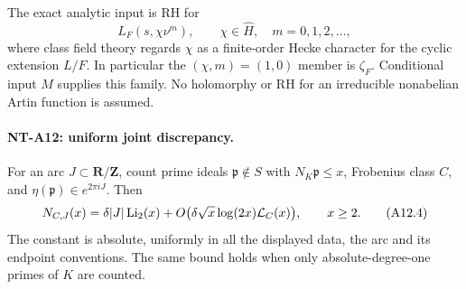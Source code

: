The exact analytic input is RH for
\[
 L_F(s,\chi\nu^m),\qquad
       \chi\in\widehat H,\quad m=0,1,2,\ldots,                 \tag{A12.3}
\]
where class field theory regards \(\chi\) as a finite-order Hecke
character for the cyclic extension \(L/F\). In particular the
\((\chi,m)=(1,0)\) member is \(\zeta_F\).
Conditional input \(M\) supplies this family. No holomorphy or RH
for an irreducible nonabelian Artin function is assumed.

\paragraph{NT-A12: uniform joint discrepancy.}
For an arc \(J\subset\mathbf R/\mathbf Z\), count prime ideals
\(\mathfrak p\notin S\) with \(N_K\mathfrak p\le x\),
Frobenius class \(C\), and \(\eta(\mathfrak p)\in e^{2\pi iJ}\).
Then
\[
 N_{C,J}(x)
   =\delta |J|\operatorname{Li}_2(x)
      +O\bigl(\delta\sqrt x\log(2x){\cal L}_C(x)\bigr),
       \qquad x\ge2.                                      \tag{A12.4}
\]
The constant is absolute, uniformly in all the displayed data,
the arc and its endpoint conventions. The same bound holds when
only absolute-degree-one primes of \(K\) are counted.

